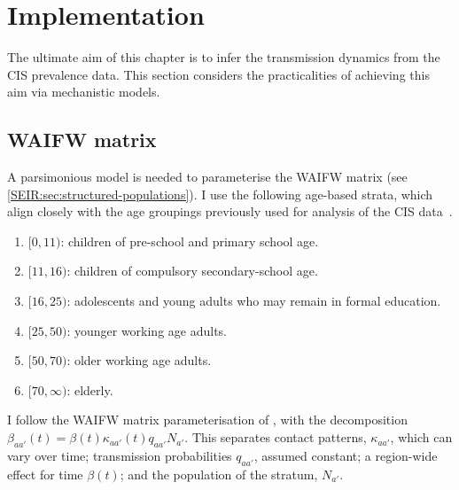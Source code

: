 \documentclass[thesis.tex]{subfiles}
\begin{document}
\section{Implementation} \label{SEIR:sec:inference-implementation}


The ultimate aim of this chapter is to infer the transmission dynamics from the CIS prevalence data.
This section considers the practicalities of achieving this aim via mechanistic models.

\subsection{WAIFW matrix}

A parsimonious model is needed to parameterise the WAIFW matrix (see \cref{SEIR:sec:structured-populations}).
I use the following age-based strata, which align closely with the age groupings previously used for analysis of the CIS data~\autocites[e.g.:][]{houseInferring}{walkerTracking}.
\begin{enumerate}
    \item $[0, 11)$: children of pre-school and primary school age.
    \item $[11, 16)$: children of compulsory secondary-school age.
    \item $[16, 25)$: adolescents and young adults who may remain in formal education.
    \item $[25, 50)$: younger working age adults.
    \item $[50, 70)$: older working age adults.
    \item $[70, \infty)$: elderly.
\end{enumerate}

I follow the WAIFW matrix parameterisation of \textcite{birrellRealtime}, with the decomposition $\beta_{aa'}(t) = \beta(t) \kappa_{aa'}(t) q_{aa'} N_{a'}$.
This separates contact patterns, $\kappa_{aa'}$, which can vary over time; transmission probabilities $q_{aa'}$, assumed constant; a region-wide effect for time $\beta(t)$; and the population of the stratum, $N_{a'}$.
\end{document}
